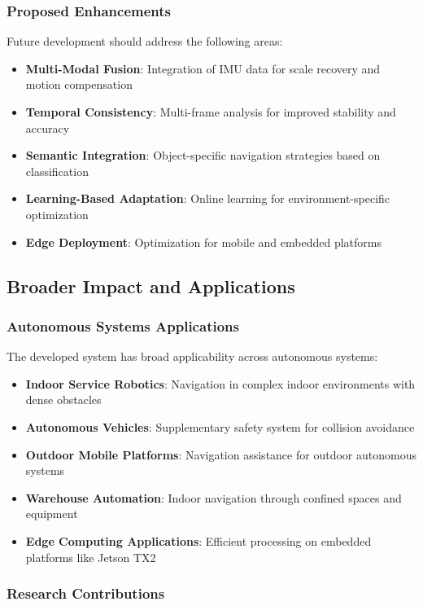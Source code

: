 \documentclass[10pt]{article}
\begin{document}
\subsubsection{Proposed Enhancements}

Future development should address the following areas:

\begin{itemize}
\item \textbf{Multi-Modal Fusion}: Integration of IMU data for scale recovery and motion compensation
\item \textbf{Temporal Consistency}: Multi-frame analysis for improved stability and accuracy
\item \textbf{Semantic Integration}: Object-specific navigation strategies based on classification
\item \textbf{Learning-Based Adaptation}: Online learning for environment-specific optimization
\item \textbf{Edge Deployment}: Optimization for mobile and embedded platforms
\end{itemize}

\subsection{Broader Impact and Applications}

\subsubsection{Autonomous Systems Applications}

The developed system has broad applicability across autonomous systems:

\begin{itemize}
\item \textbf{Indoor Service Robotics}: Navigation in complex indoor environments with dense obstacles
\item \textbf{Autonomous Vehicles}: Supplementary safety system for collision avoidance
\item \textbf{Outdoor Mobile Platforms}: Navigation assistance for outdoor autonomous systems
\item \textbf{Warehouse Automation}: Indoor navigation through confined spaces and equipment
\item \textbf{Edge Computing Applications}: Efficient processing on embedded platforms like Jetson TX2
\end{itemize}

\subsubsection{Research Contributions}
\end{document}
